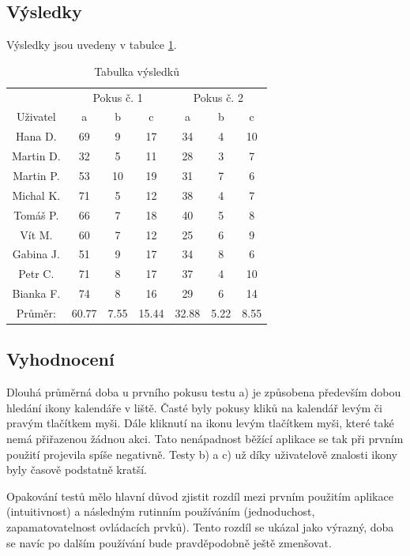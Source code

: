 \documentclass[a4paper, 12pt]{article}[7.12.2013]
\begin{document}
\subsection{Výsledky}
Výsledky jsou uvedeny v tabulce \ref{tab:vysledky}.
\begin{table}[h]
    \begin{center}
    \begin{tabular}{| c | c | c | c || c | c | c |}
    \hline
     & \multicolumn{3}{|c||}{Pokus č. 1} & \multicolumn{3}{c|}{Pokus č. 2}\\
    Uživatel & a & b & c & a & b & c \\
    \hline
    Hana D. & 69 & 9 & 17 & 34 & 4 & 10 \\
    Martin D. & 32 & 5 & 11 & 28 & 3 & 7 \\
    Martin P. & 53 & 10& 19 & 31 & 7 & 6 \\
    Michal K. & 71 & 5 & 12 & 38 & 4 & 7 \\
    Tomáš P. & 66 & 7 & 18 & 40 & 5 & 8 \\
    Vít M. & 60 & 7 & 12 & 25 & 6 & 9 \\
    Gabina J. & 51 & 9 & 17 & 34 & 8 & 6 \\
    Petr C. & 71 & 8 & 17 & 37 & 4 & 10 \\
    Bianka F. & 74 & 8 & 16 & 29 & 6 & 14 \\
    \hline
    Průměr: & 60.77 & 7.55 & 15.44 & 32.88 & 5.22 & 8.55\\
    \hline
    \end{tabular}
    \caption{Tabulka výsledků}
    \label{tab:vysledky}
    \end{center}
\end{table}

\subsection{Vyhodnocení}
Dlouhá průměrná doba u prvního pokusu testu a) je způsobena především dobou hledání ikony kalendáře v liště. Časté byly pokusy kliků na kalendář levým či pravým tlačítkem myši. Dále kliknutí na ikonu levým tlačítkem myši, které také nemá přiřazenou žádnou akci. Tato nenápadnost běžící aplikace se tak při prvním použití projevila spíše negativně. Testy b) a c) už díky uživatelově znalosti ikony byly časově podstatně kratší.

Opakování testů mělo hlavní důvod zjistit rozdíl mezi prvním použitím aplikace (intuitivnost) a následným rutinním používáním (jednoduchost, zapamatovatelnost ovládacích prvků). Tento rozdíl se ukázal jako výrazný, doba se navíc po dalším používání bude pravděpodobně ještě zmenšovat.
\end{document}
